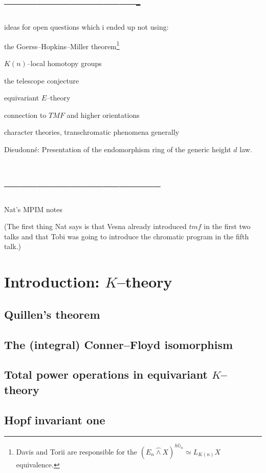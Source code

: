 \documentclass{amsart}
\newcommand{\<}{\langle}
\renewcommand{\>}{\rangle}
\theoremstyle{plain}
\theoremstyle{definition}
\theoremstyle{remark}
\begin{document}
\section{-------------------------}




ideas for open questions which i ended up not using:


the Goerss--Hopkins--Miller theorem\footnote{Davis and Torii are responsible for the $(E_n \hat\wedge X)^{h\mathbb G_n} \simeq L_{K(n)} X$ equivalence.}

$K(n)$--local homotopy groups

the telescope conjecture

equivariant $E$--theory

connection to $TMF$ and higher orientations

character theories, transchromatic phenomena generally

Dieudonn\'e: Presentation of the endomorphism ring of the generic height $d$ law.


\newpage
\section{-----------------------------}

Nat's MPIM notes

(The first thing Nat says is that Vesna already introduced $tmf$ in the first two talks and that Tobi was going to introduce the chromatic program in the fifth talk.)

\section{Introduction: $K$--theory}
    \subsection{Quillen's theorem}
    \subsection{The (integral) Conner--Floyd isomorphism}
    \subsection{Total power operations in equivariant $K$--theory}
    \subsection{Hopf invariant one}
\end{document}
